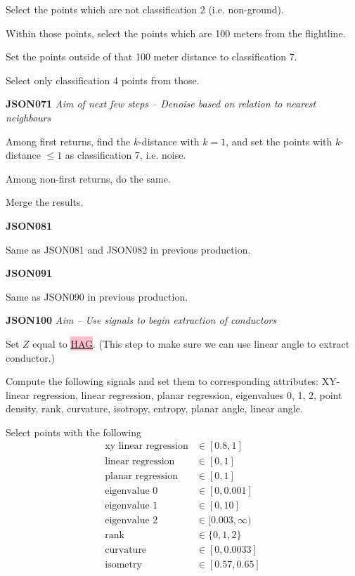 \documentclass[a4paper,11pt,twoside]{article}
\theoremstyle{definition}
\theoremstyle{remark}
\newcommand{\sh}[1]{\colorbox{pink}{#1}}
\begin{document}
\begin{list}{}{}
\item Select the points which are not classification 2 (i.e. non-ground).
\item Within those points, select the points which are 100 meters from the flightline.
\item Set the points outside of that 100 meter distance to classification 7.
\item Select only classification 4 points from those.
\item \textbf{JSON071}
\emph{Aim of next few steps -- Denoise based on relation to nearest neighbours}
\item Among first returns, find the $k$-distance with $k=1$, and set the points with $k$-distance $\leqslant 1$ as classification 7, i.e. noise.
\item Among non-first returns, do the same.
\item Merge the results.
\item \textbf{JSON081}
\item Same as JSON081 and JSON082 in previous production.
\item \textbf{JSON091}
\item Same as JSON090 in previous production.
\item \textbf{JSON100}
\emph{Aim -- Use signals to begin extraction of conductors}
\item Set $Z$ equal to \hyperref[smrf]{\sh{HAG}}. (This step to make sure we can use linear angle to extract conductor.)
\item Compute the following signals and set them to corresponding attributes: XY-linear regression, linear regression, planar regression, eigenvalues 0, 1, 2, point density, rank, curvature, isotropy, entropy, planar angle, linear angle.
\item Select points with the following
\begin{align*}
\text{xy linear regression}&\in[0.8,1]\\
\text{linear regression}&\in [0,1]\\
\text{planar regression}&\in[0,1]\\
\text{eigenvalue 0}&\in[0,0.001]\\
\text{eigenvalue 1}&\in[0,10]\\
\text{eigenvalue 2}&\in[0.003,\infty)\\
\text{rank}&\in\{0,1,2\}\\
\text{curvature}&\in[0,0.0033]\\
\text{isometry}&\in [0.57,0.65]\\

\end{align*}
\end{list}
\end{document}
